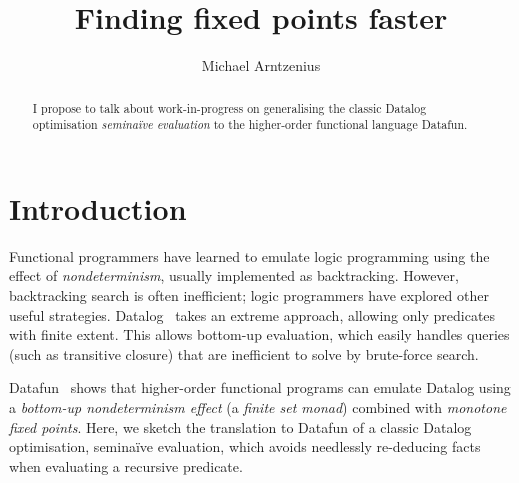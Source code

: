 \documentclass[sigplan,screen,dvipsnames]{acmart}
\title{Finding fixed points faster}
\author{Michael Arntzenius}
\affiliation{University of Birmingham}
\newcommand{\naive}{na\"ive}
\begin{document}
\thispagestyle{plain}
\setlength\arraycolsep{2.5pt}

\begin{abstract}
  I propose to talk about work-in-progress on generalising the classic Datalog
  optimisation \emph{semi\naive{} evaluation} to the higher-order functional
  language Datafun.
\end{abstract}

\maketitle

\section{Introduction}



Functional programmers have learned to emulate logic programming using the
effect of \emph{nondeterminism}, usually implemented as backtracking. However,
backtracking search is often inefficient; logic programmers have explored other
useful strategies.
%
Datalog~\citep{datalog} takes an extreme approach, allowing only predicates with
finite extent. This allows bottom-up evaluation, which easily handles queries
(such as transitive closure) that are inefficient to solve by brute-force
search.

Datafun~\cite{datafun} shows that higher-order functional programs can emulate
Datalog using a \emph{bottom-up nondeterminism effect} (a \emph{finite set
  monad}) combined with \emph{monotone fixed points}. Here, we sketch the
translation to Datafun of a classic Datalog optimisation, semi\naive{}
evaluation, which avoids needlessly re-deducing facts when evaluating a
recursive predicate.
\end{document}
